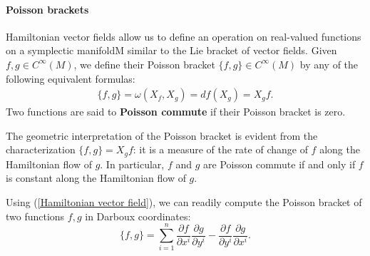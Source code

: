 \paragraph{Poisson brackets}
Hamiltonian vector fields allow us to define an operation on real-valued functions on a symplectic manifoldM similar to the Lie bracket of vector fields. Given $f,g\in C^\infty(M)$, we define their Poisson bracket $\{f,g\}\in C^\infty(M)$ by any of the following equivalent formulas:
\begin{align}\label{Possion bracket}
\{f,g\}=\omega(X_f,X_g)=df(X_g)=X_gf.
\end{align}
Two functions are said to \textbf{Poisson commute} if their Poisson bracket is zero.\par
The geometric interpretation of the Poisson bracket is evident from the characterization $\{f,g\}=X_gf$: it is a measure of the rate of change of $f$ along the Hamiltonian flow of $g$. In particular, $f$ and $g$ are Poisson commute if and only if $f$ is constant along the Hamiltonian flow of $g$.\par
Using (\ref{Hamiltonian vector field}), we can readily compute the Poisson bracket of two functions $f,g$ in Darboux coordinates:
\[\{f,g\}=\sum_{i=1}^{n}\frac{\partial f}{\partial x^i}\frac{\partial g}{\partial y^i}-\frac{\partial f}{\partial y^i}\frac{\partial g}{\partial x^i}.\]

